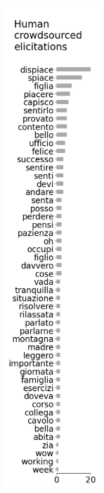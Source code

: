 \begin{figure}[!htbp]
    \centering
    \begin{subfigure}[t]{0.25\textwidth}
        \centering
        \captionsetup{width=.8\linewidth}%
        \includegraphics[height=18cm]{assets/imgs/dataset-test-set-top-50-answers-vertical.png}
        \label{sub:persona-narrative-elicitation-comparison-distribution-human}
    \end{subfigure}
    \hspace{-1cm}
    \begin{subfigure}[t]{0.45\textwidth}
        \centering
        \captionsetup{width=.8\linewidth}%

\end{subfigure}
\end{figure}
